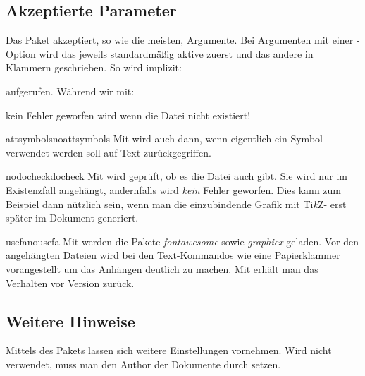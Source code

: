 \documentclass{sopra-base}
\begin{document}
\subsection{Akzeptierte Parameter}
    Das Paket akzeptiert, so wie die meisten, Argumente.
    Bei Argumenten mit einer -Option wird das jeweils standardmäßig aktive zuerst und das andere in Klammern
    geschrieben. So wird implizit:
\begin{plainlatex}
    \usepackage[attsymbols,nodocheck,usefa]{sopra-attachments}
\end{plainlatex}
    aufgerufen. Während wir mit:
\begin{plainlatex}
    \usepackage[docheck]{sopra-attachments}
\end{plainlatex}
    kein Fehler geworfen wird wenn die Datei nicht existiert!

    \begin{argument}{attsymbols}{noattsymbols}
        Mit  wird auch dann, wenn eigentlich ein Symbol verwendet werden
        soll auf Text zurückgegriffen.
    \end{argument}

    \begin{argument}{nodocheck}{docheck}
        Mit  wird geprüft, ob es die Datei auch gibt. Sie wird nur im Existenzfall
        angehängt, andernfalls wird \emph{kein} Fehler geworfen. Dies kann zum Beispiel dann
        nützlich sein, wenn man die einzubindende Grafik mit Ti\textit{k}Z- erst
        später im Dokument generiert.
    \end{argument}

    \begin{argument}{usefa}{nousefa}
        Mit  werden die Pakete \emph{fontawesome} sowie \emph{graphicx} geladen. Vor den angehängten Dateien wird bei den Text-Kommandos wie  eine Papierklammer vorangestellt um das Anhängen deutlich zu machen. Mit  erhält man das Verhalten vor Version  zurück.
    \end{argument}

\subsection{Weitere Hinweise}

    Mittels  des Pakets  lassen sich weitere
    Einstellungen vornehmen. Wird nicht  verwendet, muss man den Author
    der Dokumente durch  setzen.
\end{document}
